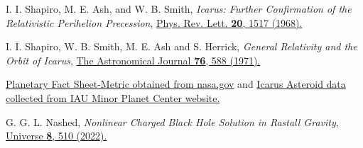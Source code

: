 \documentclass[aps,amsmath,amssymb,showpacs,showkeys]{revtex4}
\begin{document}
\begin{thebibliography}{99}
I. I. Shapiro, M. E. Ash, and W. B. Smith, \textit{Icarus: Further Confirmation of the Relativistic Perihelion Precession}, \href{https://doi.org/10.1103/PhysRevLett.20.1517}{Phys. Rev. Lett. \textbf{20}, 1517 (1968).}

I. I. Shapiro, W. B. Smith, M. E. Ash and S. Herrick, \textit{General Relativity and the Orbit of Icarus}, \href{https://adsabs.harvard.edu/full/1971AJ.....76..588S}{The Astronomical Journal \textbf{76}, 588 (1971).}

\href{https://nssdc.gsfc.nasa.gov/planetary/factsheet/}{Planetary Fact Sheet-Metric obtained from nasa.gov} and \href{https://www.minorplanetcenter.net/db_search/show_object?object_id=1566}{Icarus Asteroid data collected from IAU Minor Planet Center website.}

G. G. L. Nashed, \textit{Nonlinear Charged Black Hole Solution in Rastall Gravity}, \href{https://doi.org/10.3390/universe8100510}{Universe \textbf{8}, 510 (2022).}









\end{thebibliography}
\end{document}
